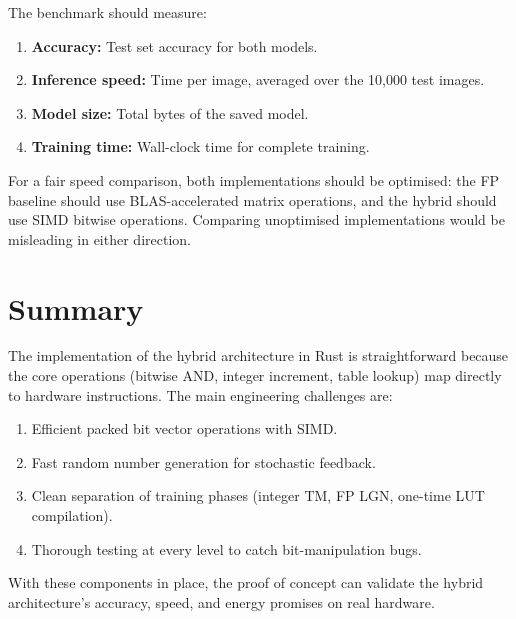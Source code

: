 The benchmark should measure:
\begin{enumerate}
  \item \textbf{Accuracy:} Test set accuracy for both models.
  \item \textbf{Inference speed:} Time per image, averaged over the
    10,000 test images.
  \item \textbf{Model size:} Total bytes of the saved model.
  \item \textbf{Training time:} Wall-clock time for complete training.
\end{enumerate}

\begin{engineernote}
For a fair speed comparison, both implementations should be optimised:
the FP baseline should use BLAS-accelerated matrix operations, and
the hybrid should use SIMD bitwise operations. Comparing unoptimised
implementations would be misleading in either direction.
\end{engineernote}


\section{Summary}
\label{sec:ch14-summary}

The implementation of the hybrid architecture in Rust is
straightforward because the core operations (bitwise AND, integer
increment, table lookup) map directly to hardware instructions.
The main engineering challenges are:

\begin{enumerate}
  \item Efficient packed bit vector operations with SIMD.
  \item Fast random number generation for stochastic feedback.
  \item Clean separation of training phases (integer TM, FP LGN,
    one-time LUT compilation).
  \item Thorough testing at every level to catch bit-manipulation bugs.
\end{enumerate}

With these components in place, the proof of concept can validate the
hybrid architecture's accuracy, speed, and energy promises on real
hardware.
